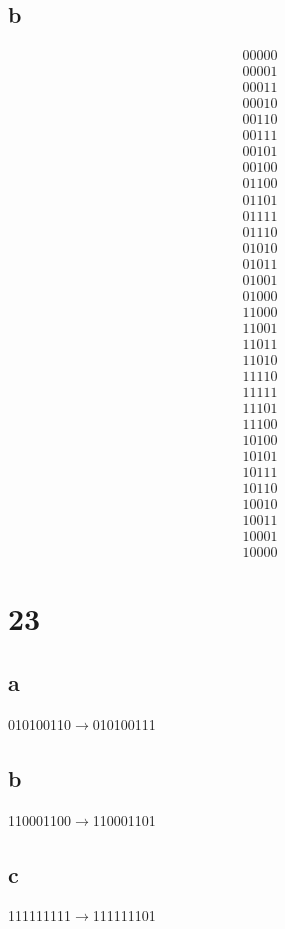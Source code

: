 \documentclass{article}
\begin{document}
\subsection*{b}
\begin{align*}
  00000\\
  00001\\
  00011\\
  00010\\
  00110\\
  00111\\
  00101\\
  00100\\
  01100\\
  01101\\
  01111\\
  01110\\
  01010\\
  01011\\
  01001\\
  01000\\
  11000\\
  11001\\
  11011\\
  11010\\
  11110\\
  11111\\
  11101\\
  11100\\
  10100\\
  10101\\
  10111\\
  10110\\
  10010\\
  10011\\
  10001\\
  10000
\end{align*}
\section*{23}
\subsection*{a}
010100110$\to$010100111
\subsection*{b}
110001100$\to$110001101
\subsection*{c}
111111111$\to$111111101
\end{document}
